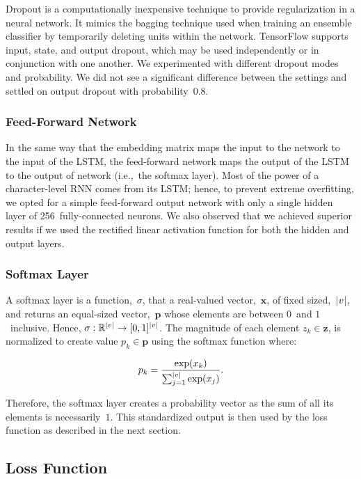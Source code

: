 \documentclass{article}
\DeclarePairedDelimiter\abs{\lvert}{\rvert}%
\begin{document}
Dropout is a computationally inexpensive technique to provide regularization in a neural network.  It mimics the bagging technique used when training an ensemble classifier by temporarily deleting units within the network.\cite{goodfellow2016}  TensorFlow supports input, state, and output dropout, which may be used independently or in conjunction with one another.  We experimented with different dropout modes and probability.  We did not see a significant difference between the settings and settled on output dropout with probability~0.8.

\subsubsection{Feed-Forward Network}

In the same way that the embedding matrix maps the input to the network to the input of the LSTM, the feed-forward network maps the output of the LSTM to the output of network (i.e.,~the softmax layer).  Most of the power of a character-level RNN comes from its LSTM; hence, to prevent extreme overfitting, we opted for a simple feed-forward output network with only a single hidden layer of 256~fully-connected neurons.   We also observed that we achieved superior results if we used the rectified linear activation function for both the hidden and output layers.


\subsubsection{Softmax Layer}

A softmax layer is a function,~$\sigma$, that a real-valued vector,~$\mathbf{x}$, of fixed sized,~$\abs*{v}$, and returns an equal-sized vector,~$\mathbf{p}$ whose elements are between $0$~and $1$~inclusive.  Hence, $\sigma : \mathbb{R}^{\abs*{v}} \rightarrow [0,1]^{\abs*{v}}$.  The magnitude of each element $z_k \in \mathbf{z}$, is normalized to create value $p_k \in \mathbf{p}$ using the softmax function where:

\begin{equation}
  p_k = \frac{\exp(x_k)}{\sum_{j=1}^{\abs*{v}} \exp(x_j)}\textrm{.}
\end{equation}

Therefore, the softmax layer creates a probability vector as the sum of all its elements is necessarily~$1$. This standardized output is then used by the loss function as described in the next section.

\subsection{Loss Function}
\end{document}
